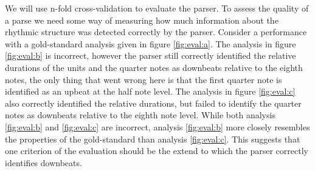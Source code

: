 We will use n-fold cross-validation to evaluate the parser. To assess the quality of a parse we need some way of measuring how much information about the rhythmic structure was detected correctly by the parser.  Consider a performance with a gold-standard analysis given in figure \ref{fig:eval:a}. The analysis in figure \ref{fig:eval:b} is incorrect, however the parser still correctly identified the relative durations of the units and the quarter notes as downbeats relative to the eighth notes, the only thing that went wrong here is that the first quarter note is identified as an upbeat at the half note level. The analysis in figure \ref{fig:eval:c} also correctly identified the relative durations, but failed to identify the quarter notes as downbeats relative to the eighth note level. While both analysis \ref{fig:eval:b} and \ref{fig:eval:c} are incorrect, analysis \ref{fig:eval:b} more closely resembles the properties of the gold-standard than analysis \ref{fig:eval:c}. This suggests that one criterion of the evaluation should be the extend to which the parser correctly identifies downbeats. 
